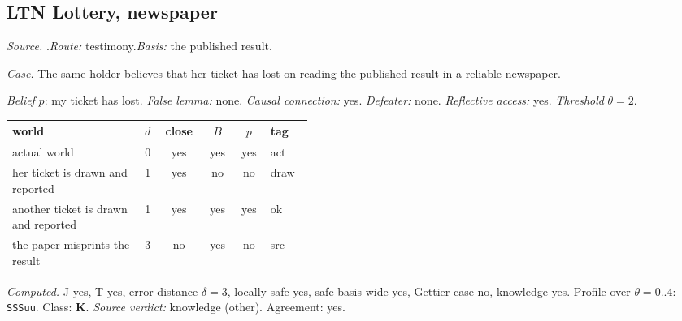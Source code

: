 \subsection*{LTN \enspace Lottery, newspaper}
\noindent\textit{Source.} \citet{Hawthorne2004}.\quad \textit{Route:} testimony.\quad \textit{Basis:} the published result.\par
\noindent\textit{Case.} The same holder believes that her ticket has lost on reading the published result in a reliable newspaper.\par
\noindent\textit{Belief} $p$: my ticket has lost.
 \textit{False lemma:} none. \textit{Causal connection:} yes. \textit{Defeater:} none. \textit{Reflective access:} yes. \textit{Threshold} $\theta = 2$.\par
\begin{center}\begin{tabular}{@{}p{0.43\linewidth}rcccl@{}}
world & $d$ & close & $B$ & $p$ & tag \\ \midrule
actual world & 0 & yes & yes & yes & act \\
her ticket is drawn and reported & 1 & yes & no & no & draw \\
another ticket is drawn and reported & 1 & yes & yes & yes & ok \\
the paper misprints the result & 3 & no & yes & no & src \\
\end{tabular}\end{center}
\noindent\textit{Computed.} J yes, T yes, error distance $\delta = 3$, locally safe yes, safe basis-wide yes, Gettier case no, knowledge yes. Profile over $\theta = 0..4$: \texttt{SSSuu}. Class: \textbf{K}.
 \textit{Source verdict:} knowledge (other). Agreement: yes.
\par\medskip
{}
